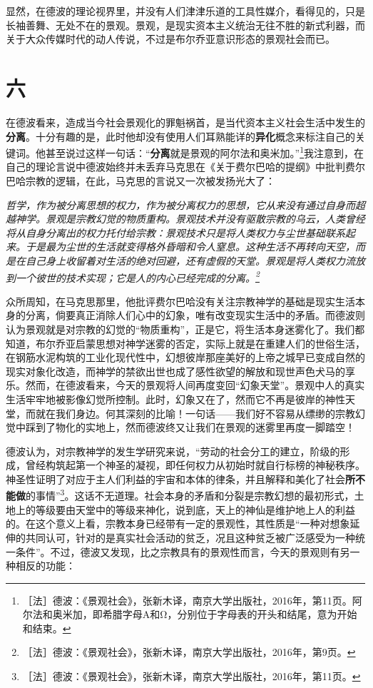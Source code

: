 \documentclass[fontset=fandol, a4paper, 12pt, openright]{ctexbook}
\renewenvironment{quote}
  {\list{}{\rightmargin\leftmargin}%
   \item\relax\small\itshape\color{darkgray}}
  {\endlist}
\begin{document}
显然，在德波的理论视界里，并没有人们津津乐道的工具性媒介，看得见的，只是长袖善舞、无处不在的景观。景观，是现实资本主义统治无往不胜的新式利器，而关于大众传媒时代的动人传说，不过是布尔乔亚意识形态的景观社会而已。

\section*{六}

在德波看来，造成当今社会景观化的罪魁祸首，是当代资本主义社会生活中发生的\textbf{分离}。{\kaishu 十分有趣的是，此时他却没有使用人们耳熟能详的\textbf{异化}概念来标注自己的关键词。}他甚至说过这样一句话：“\textbf{分离}就是景观的阿尔法和奥米加。”\footnote{［法］德波：《景观社会》，张新木译，南京大学出版社，2016年，第11页。阿尔法和奥米加，即希腊字母Α和Ω，分别位于字母表的开头和结尾，意为开始和结束。}我注意到，在自己的理论言说中德波始终并未丢弃马克思在《关于费尔巴哈的提纲》中批判费尔巴哈宗教的逻辑，在此，马克思的言说又一次被发扬光大了：

\begin{quote}
哲学，作为被分离思想的权力，作为被分离权力的思想，它从来没有通过自身而超越神学。景观是宗教幻觉的物质重构。景观技术并没有驱散宗教的乌云，人类曾经将从自身分离出的权力托付给宗教：景观技术只是将人类权力与尘世基础联系起来。于是最为尘世的生活就变得格外昏暗和令人窒息。这种生活不再转向天空，而是在自己身上收留着对生活的绝对回避，还有虚假的天堂。景观是将人类权力流放到一个彼世的技术实现；它是人的内心已经完成的分离。\footnote{［法］德波：《景观社会》，张新木译，南京大学出版社，2016年，第9页。}
\end{quote}

众所周知，在马克思那里，他批评费尔巴哈没有关注宗教神学的基础是现实生活本身的分离，倘要真正消除人们心中的幻象，唯有改变现实生活中的矛盾。而德波则认为景观就是对宗教的幻觉的“物质重构”，正是它，将生活本身迷雾化了。我们都知道，布尔乔亚启蒙思想对神学迷雾的否定，实际上就是在重建人们的世俗生活，在钢筋水泥构筑的工业化现代性中，幻想彼岸那座美好的上帝之城早已变成自然的现实对象化改造，而神学的禁欲出世也成了感性欲望的解放和现世声色犬马的享乐。然而，在德波看来，今天的景观将人间再度变回“幻象天堂”。景观中人的真实生活牢牢地被影像幻觉所控制。此时，幻象又在了，然而它不再是彼岸的神性天堂，而就在我们身边。何其深刻的比喻！一句话——我们好不容易从缥缈的宗教幻觉中踩到了物化的实地上，然而德波终又让我们在景观的迷雾里再度一脚踏空！

德波认为，对宗教神学的发生学研究来说，“劳动的社会分工的建立，阶级的形成，曾经构筑起第一个神圣的凝视，即任何权力从初始时就自行标榜的神秘秩序。神圣性证明了对应于主人们利益的宇宙和本体的律条，并且解释和美化了社会\textbf{所不能做}的事情”\footnote{［法］德波：《景观社会》，张新木译，南京大学出版社，2016年，第11页。}。这话不无道理。社会本身的矛盾和分裂是宗教幻想的最初形式，土地上的等级要由天堂中的等级来神化，说到底，天上的神仙是维护地上人的利益的。在这个意义上看，宗教本身已经带有一定的景观性，其性质是“一种对想象延伸的共同认可，针对的是真实社会活动的贫乏，况且这种贫乏被广泛感受为一种统一条件”。不过，德波又发现，比之宗教具有的景观性而言，今天的景观则有另一种相反的功能：
\end{document}

